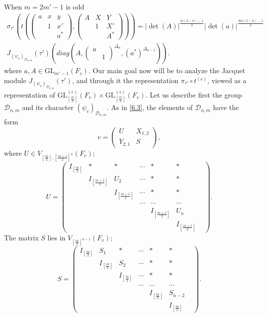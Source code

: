 \documentclass[12pts]{amsart}
\newcommand{\GL}{{\mathrm{GL}}}
\begin{document}
When $m=2m'-1$ is odd
\begin{multline}\label{12.64.2}
\sigma_{\tau'}(t(\begin{pmatrix}a&x&y\\&1&x'\\&&a^*\end{pmatrix}, \begin{pmatrix}A&X&Y\\&1&X'\\&&A^*\end{pmatrix}))=|\det(A)|^{\frac{m(2-n)-1}{2}}|\det(a)|^{\frac{3m(2-n)-1}{2}}\\
J_{(\psi_v)_{\mathcal{D}_{n,m}}}(\tau')(diag(A, \begin{pmatrix}a\\&1\end{pmatrix}^{\Delta_n},(a^*)^{\Delta_{n-1}})).
\end{multline}
where $a, A\in \GL_{m'-1}(F_v)$. Our main goal now will be to analyze the Jacquet module
$J_{(\psi_v)_{\mathcal{D}_{n,m}}}(\tau')$, and through it the representation $\pi_{\tau'}\circ t^{(\epsilon)}$, viewed as a representation of $\GL^{(\epsilon)}_{[\frac{m}{2}]}(F_v)\times \GL^{(\epsilon)}_{[\frac{m}{2}]}(F_v)$. Let us describe first the group $\mathcal{D}_{n,m}$ and its character $(\psi_v)_{\mathcal{D}_{n,m}}$. As in \eqref{6.3}, the elements of $\mathcal{D}_{n,m}$ have the form 
\begin{equation}\label{12.65}
v=\begin{pmatrix}U&X_{1,2}\\Y_{2,1}&S\end{pmatrix},
\end{equation}
where $U\in V_{[\frac{m}{2}], [\frac{m+1}{2}]^n}(F_v)$; 
\begin{equation}\label{12.66}
U=\begin{pmatrix}I_{[\frac{m}{2}]}&*&*&\cdots&*&*\\
&I_{[\frac{m+1}{2}]}&U_2&\cdots&*&*\\
& &I_{[\frac{m+1}{2}]}&\cdots &* & * \\
& & & \cdots& \cdots&\cdots &\\
& & &       &I_{[\frac{m+1}{2}]}&U_n\\
& & &       & &I_{[\frac{m+1}{2}]}\end{pmatrix}.
\end{equation}
The matrix $S$ lies in $V_{[\frac{m}{2}]^{n-1}}(F_v)$;
\begin{equation}\label{12.67}
S=\begin{pmatrix}I_{[\frac{m}{2}]}&S_1&*&\cdots&*&*\\
&I_{[\frac{m}{2}]}&S_2&\cdots&*&*\\
& &I_{[\frac{m}{2}]}&\cdots &* & * \\
& & & \cdots& \cdots&\cdots &\\
& & &       &I_{[\frac{m}{2}]}&S_{n-2}\\
& & &       & &I_{[\frac{m}{2}]}\end{pmatrix}.
\end{equation}
\end{document}
